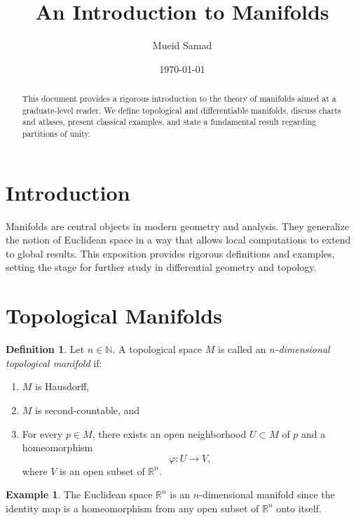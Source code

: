 \documentclass[11pt]{amsart}
\title{An Introduction to Manifolds}
\author{Mueid Samad}
\date{\today}
\theoremstyle{definition}
\newtheorem{definition}[theorem]{Definition}
\newtheorem{example}[theorem]{Example}
\begin{document}
\maketitle

\begin{abstract}
This document provides a rigorous introduction to the theory of manifolds aimed at a graduate-level reader. We define topological and differentiable manifolds, discuss charts and atlases, present classical examples, and state a fundamental result regarding partitions of unity.
\end{abstract}

\section{Introduction}
Manifolds are central objects in modern geometry and analysis. They generalize the notion of Euclidean space in a way that allows local computations to extend to global results. This exposition provides rigorous definitions and examples, setting the stage for further study in differential geometry and topology.

\section{Topological Manifolds}
\begin{definition}
Let $n\in\mathbb{N}$. A topological space $M$ is called an \emph{$n$-dimensional topological manifold} if:
\begin{enumerate}
    \item $M$ is Hausdorff,
    \item $M$ is second-countable, and
    \item For every $p\in M$, there exists an open neighborhood $U\subset M$ of $p$ and a homeomorphism 
    \[
    \varphi: U \to V,
    \]
    where $V$ is an open subset of $\mathbb{R}^n$.
\end{enumerate}
\end{definition}

\begin{example}
The Euclidean space $\mathbb{R}^n$ is an $n$-dimensional manifold since the identity map is a homeomorphism from any open subset of $\mathbb{R}^n$ onto itself.
\end{example}
\end{document}
